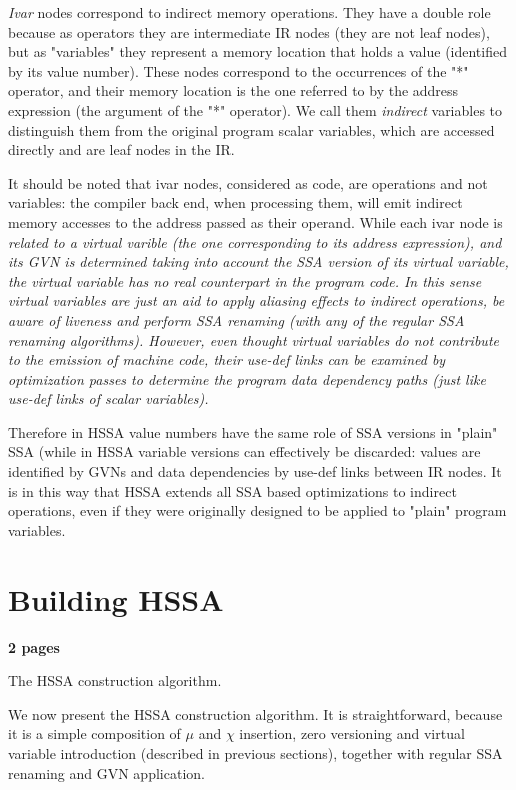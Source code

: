 {\em Ivar} nodes correspond to indirect memory operations.
They have a double role because as operators they are intermediate IR nodes (they are not leaf nodes), but as "variables" they represent a memory location that holds a value (identified by its value number).
These nodes correspond to the occurrences of the "*" operator, and their memory location is the one referred to by the address expression (the argument of the "*" operator).
We call them {\em indirect} variables to distinguish them from the original program scalar variables, which are accessed directly and are leaf nodes in the IR.

It should be noted that ivar nodes, considered as code, are operations and not variables: the compiler back end, when processing them, will emit indirect memory accesses to the address passed as their operand.
While each ivar node is \em{related} to a virtual varible (the one corresponding to its address expression), and its GVN is determined taking into account the SSA version of its virtual variable, the virtual variable has no real counterpart in the program code.
In this sense virtual variables are just an aid to apply aliasing effects to indirect operations, be aware of liveness and perform SSA renaming (with any of the regular SSA renaming algorithms).
However, even thought virtual variables do not contribute to the emission of machine code, their use-def links can be examined by optimization passes to determine the program data dependency paths (just like use-def links of scalar variables).

Therefore in HSSA value numbers have the same role of SSA versions in "plain" SSA (while in HSSA variable versions can effectively be discarded: values are identified by GVNs and data dependencies by use-def links between IR nodes.
It is in this way that HSSA extends all SSA based optimizations to indirect operations, even if they were originally designed to be applied to "plain" program variables.


\section{Building HSSA}
\textbf{2 pages}

The HSSA construction algorithm.

We now present the HSSA construction algorithm.
It is straightforward, because it is a simple composition of $\mu$ and $\chi$ insertion, zero versioning and virtual variable introduction (described in previous sections), together with regular SSA renaming and GVN application.


